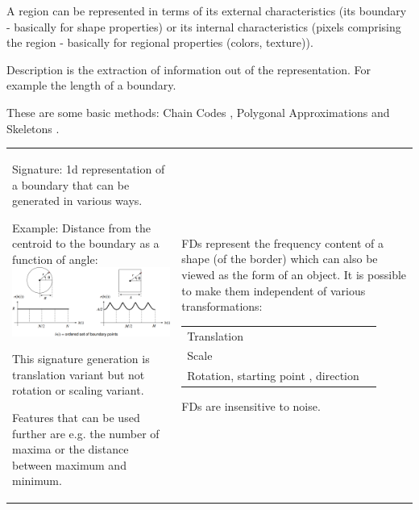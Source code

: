    A region can be represented in terms of its external characteristics (its boundary - basically for shape properties) or
    its internal characteristics (pixels comprising the region - basically for regional properties (colors, texture)).
    
    Description is the extraction of information out of the representation. For example the length
    of a boundary.
    
    These are some basic methods: Chain Codes , Polygonal Approximations 
     and Skeletons .
    
    \begin{tabular}{ll}
      \parbox{10cm}{
          Signature: 1d representation of a boundary that can be generated in various ways.
          
          Example: Distance from the centroid to the boundary as a function of angle:\\
          \includegraphics[width=9cm]{./images/signature.png}
          
          This signature generation is translation variant but not rotation or scaling variant.
          
          Features that can be used further are e.g. the number of maxima or the distance between maximum and minimum.}
      & \parbox{9cm}{
            FDs represent the frequency content of a shape (of the border) which can also be viewed as the form of an object.
            It is possible to make them independent of various transformations:\\
            \begin{tabular}{ll}
              Translation & $F(0) = 0$\\
              Scale & $F(u) = \frac{F(u)}{|F(1)|}$\\
              Rotation, starting point , direction & $F(u) = |F(u)|$ 
            \end{tabular}
            FDs are insensitive to noise.
            
}
\end{tabular}
